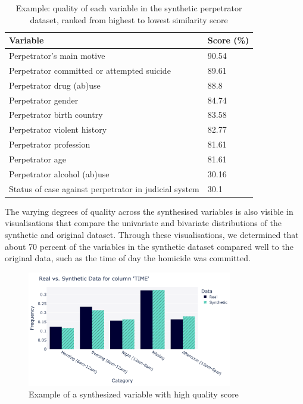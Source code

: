 \vspace{10pt}

\vspace{10pt}
\begin{table}[H]
\small
\centering
\begin{tabular}{@{}ll@{}}
\toprule
Variable                                              & Score (\%)   \\ \midrule
Perpetrator's main motive                             & 90.54 \\
Perpetrator committed or attempted suicide            & 89.61 \\
Perpetrator drug (ab)use                              & 88.8  \\
Perpetrator gender                                    & 84.74 \\
Perpetrator birth country                             & 83.58 \\
Perpetrator violent history                           & 82.77 \\
Perpetrator profession                                & 81.61 \\
Perpetrator age                                       & 81.61 \\
Perpetrator alcohol (ab)use                           & 30.16 \\
Status of case against perpetrator in judicial system & 30.1 \\ \bottomrule
\end{tabular}
\caption{Example: quality of each variable in the synthetic perpetrator dataset, ranked from highest to lowest similarity score}
\label{tab:my-table}
\end{table}
\vspace{10pt}

The varying degrees of quality across the synthesised variables is also visible in visualisations that compare the univariate and bivariate distributions of the synthetic and original dataset. Through these visualisations, we determined that about 70 percent of the variables in the synthetic dataset compared well to the original data, such as the time of day the homicide was committed.

\vspace{10pt}
\begin{figure}[H]
    \centering
    \includegraphics[width=0.8\textwidth]{Images/timefirst.png}
    \caption{Example of a synthesized variable with high quality score}
    \label{fig:proof_1}
\end{figure}
\vspace{10pt}

